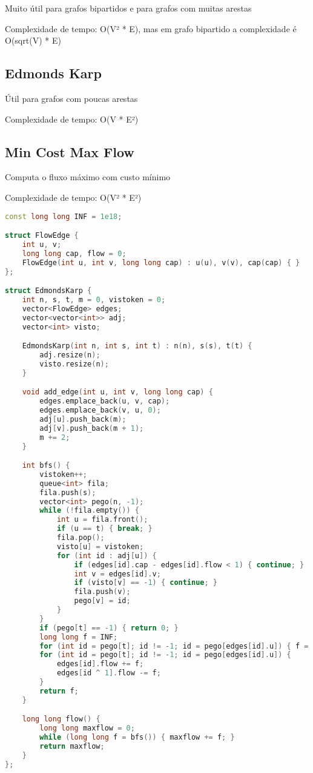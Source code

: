 \documentclass[11pt, a4paper, twoside]{article}
\begin{document}
Muito útil para grafos bipartidos e para grafos com muitas arestas

Complexidade de tempo: O(V² * E), mas em grafo bipartido a complexidade é O(sqrt(V) * E)

\subsection{Edmonds Karp}


Útil para grafos com poucas arestas

Complexidade de tempo: O(V * E²)

\subsection{Min Cost Max Flow}


Computa o fluxo máximo com custo mínimo

Complexidade de tempo: O(V² * E²)

\begin{lstlisting}[language=C++]
const long long INF = 1e18;

struct FlowEdge {
    int u, v;
    long long cap, flow = 0;
    FlowEdge(int u, int v, long long cap) : u(u), v(v), cap(cap) { }
};

struct EdmondsKarp {
    int n, s, t, m = 0, vistoken = 0;
    vector<FlowEdge> edges;
    vector<vector<int>> adj;
    vector<int> visto;

    EdmondsKarp(int n, int s, int t) : n(n), s(s), t(t) {
        adj.resize(n);
        visto.resize(n);
    }

    void add_edge(int u, int v, long long cap) {
        edges.emplace_back(u, v, cap);
        edges.emplace_back(v, u, 0);
        adj[u].push_back(m);
        adj[v].push_back(m + 1);
        m += 2;
    }

    int bfs() {
        vistoken++;
        queue<int> fila;
        fila.push(s);
        vector<int> pego(n, -1);
        while (!fila.empty()) {
            int u = fila.front();
            if (u == t) { break; }
            fila.pop();
            visto[u] = vistoken;
            for (int id : adj[u]) {
                if (edges[id].cap - edges[id].flow < 1) { continue; }
                int v = edges[id].v;
                if (visto[v] == -1) { continue; }
                fila.push(v);
                pego[v] = id;
            }
        }
        if (pego[t] == -1) { return 0; }
        long long f = INF;
        for (int id = pego[t]; id != -1; id = pego[edges[id].u]) { f = min(f, edges[id].cap - edges[id].flow); }
        for (int id = pego[t]; id != -1; id = pego[edges[id].u]) {
            edges[id].flow += f;
            edges[id ^ 1].flow -= f;
        }
        return f;
    }

    long long flow() {
        long long maxflow = 0;
        while (long long f = bfs()) { maxflow += f; }
        return maxflow;
    }
};
\end{lstlisting}
\end{document}
